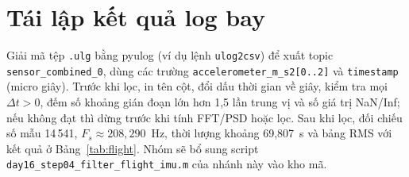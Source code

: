 \documentclass[../main.tex]{subfiles}
\begin{document}
\section{Tái lập kết quả log bay}

Giải mã tệp \texttt{.ulg} bằng pyulog (ví dụ lệnh \texttt{ulog2csv}) để xuất topic \texttt{sensor\_combined\_0}, dùng các trường \texttt{accelerometer\_m\_s2[0..2]} và \texttt{timestamp} (micro giây). Trước khi lọc, in tên cột, đổi dấu thời gian về giây, kiểm tra mọi $\Delta t>0$, đếm số khoảng gián đoạn lớn hơn 1,5 lần trung vị và số giá trị NaN/Inf; nếu không đạt thì dừng trước khi tính FFT/PSD hoặc lọc. Sau khi lọc, đối chiếu số mẫu 14\,541, $F_s\approx208{,}290$~Hz, thời lượng khoảng 69,807~s và bảng RMS với kết quả ở Bảng~\ref{tab:flight}. Nhóm sẽ bổ sung script \texttt{day16\_step04\_filter\_flight\_imu.m} của nhánh này vào kho mã.
\end{document}

